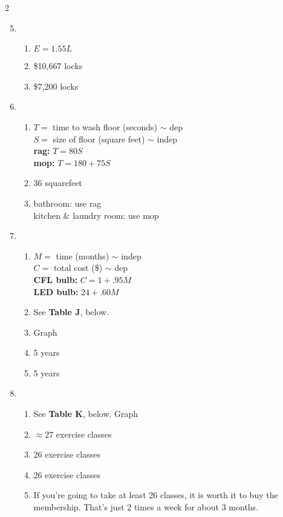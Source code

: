 \begin{multicols} {2}
\begin{enumerate}
\setcounter{enumi}{4}

\item %
\begin{enumerate}
\item $E=1.55L$
\item \$10,667 locks
\item \$7,200 locks
\end{enumerate}

\item %
\begin{enumerate}
\item $T=$ time to wash floor (seconds) $\sim$ dep \\ $S=$ size of floor (square feet) $\sim$ indep \\ \textbf{rag:} $T = 80S$ \\ \textbf{mop:} $T=180+75S$
\item 36 squarefeet
\item bathroom: use rag \\ kitchen \& laundry room: use mop
\end{enumerate}

\item %
\begin{enumerate}
\item $M=$ time (months) $\sim$ indep \\ $C=$ total cost (\$) $\sim$ dep \\ \textbf{CFL bulb:} $C = 1+.95M$ \\ \textbf{LED bulb:} $24 + .60M$
\item See \textbf{Table J}, below.
\item Graph
\item 5 years
\item 5 years
\end{enumerate}

\item %
\begin{enumerate}
\item See \textbf{Table K}, below.  Graph
\item $\approx 27$ exercise classes
\item 26 exercise classes
\item 26 exercise classes
\item If you're going to take at least 26 classes, it is worth it to buy the membership.  That's just 2 times a week for about 3 months.
\end{enumerate}


\end{enumerate}
\end{multicols}
